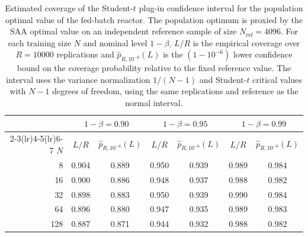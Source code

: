 \begin{table}[t]
  \centering
  \caption{Estimated coverage of the Student-$t$ plug-in confidence interval for the population optimal value of the fed-batch reactor. The population optimum is proxied by the SAA optimal value on an independent reference sample of size $N_{\mathrm{ref}}=4096$. For each training size $N$ and nominal level $1-\beta$, $L/R$ is the empirical coverage over $R=10000$ replications and $\widehat p_{R,10^{-6}}(L)$ is the $(1-10^{-6})$ lower confidence bound on the coverage probability relative to the fixed reference value. The interval uses the variance normalization $1/(N-1)$ and Student-$t$ critical values with $N-1$ degrees of freedom, using the same replications and reference as the normal interval.}
  \begin{tabular}{rcccccc}
    \toprule
     & \multicolumn{2}{c}{$1-\beta = 0.90$} & \multicolumn{2}{c}{$1-\beta = 0.95$} & \multicolumn{2}{c}{$1-\beta = 0.99$} \\
    \cmidrule(lr){2-3}\cmidrule(lr){4-5}\cmidrule(lr){6-7}
    $N$ & $L/R$ & $\widehat p_{R,10^{-6}}(L)$ & $L/R$ & $\widehat p_{R,10^{-6}}(L)$ & $L/R$ & $\widehat p_{R,10^{-6}}(L)$ \\
    \midrule
    8 & 0.904 & 0.889 & 0.950 & 0.939 & 0.989 & 0.984 \\
    16 & 0.900 & 0.886 & 0.948 & 0.937 & 0.988 & 0.982 \\
    32 & 0.898 & 0.883 & 0.950 & 0.939 & 0.990 & 0.984 \\
    64 & 0.896 & 0.880 & 0.947 & 0.935 & 0.989 & 0.983 \\
    128 & 0.887 & 0.871 & 0.944 & 0.932 & 0.988 & 0.982 \\
    \bottomrule
  \end{tabular}
  \label{table:fed-batch-coverage-t}
\end{table}
